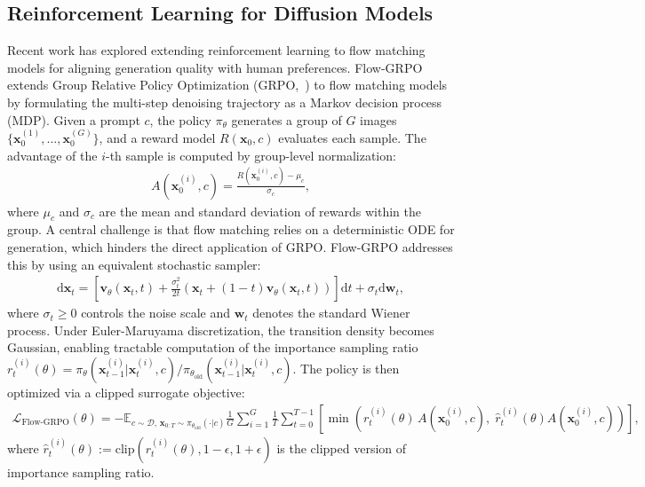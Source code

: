 \documentclass{llmxive}
\providecommand{\bm}[1]{\boldsymbol{#1}}
\providecommand{\mathbf}[1]{\bm{#1}}
\begin{document}
\subsection{Reinforcement Learning for Diffusion Models}
\label{sec:rl_background}

Recent work has explored extending reinforcement learning to flow matching models for aligning generation quality with human preferences. Flow-GRPO~\citep{liu2025flowgrpo} extends Group Relative Policy Optimization (GRPO,~\citealt{shao2024deepseekmath}) to flow matching models by formulating the multi-step denoising trajectory as a Markov decision process (MDP). Given a prompt $c$, the policy $\pi_\theta$ generates a group of $G$ images $\{\mathbf{x}_0^{(1)}, \ldots, \mathbf{x}_0^{(G)}\}$, and a reward model $R(\mathbf{x}_0, c)$ evaluates each sample. The advantage of the $i$-th sample is computed by group-level normalization:
\begin{align}
    A(\mathbf{x}_0^{(i)}, c) = \frac{R(\mathbf{x}_0^{(i)}, c) - \mu_c}{\sigma_c},
    \label{eq:rl_adv}
\end{align}
where $\mu_c$ and $\sigma_c$ are the mean and standard deviation of rewards within the group. A central challenge is that flow matching relies on a deterministic ODE for generation, which hinders the direct application of GRPO. Flow-GRPO addresses this by using an equivalent stochastic sampler:
\begin{align}
    \mathrm{d}\mathbf{x}_t = \left[\mathbf{v}_\theta(\mathbf{x}_t, t) + \frac{\sigma_t^2}{2t}\left(\mathbf{x}_t + (1-t)\mathbf{v}_\theta(\mathbf{x}_t, t)\right)\right]\mathrm{d}t + \sigma_t \mathrm{d}\mathbf{w}_t,
    \label{eq:flow_sde}
\end{align}
where $\sigma_t\geq0$ controls the noise scale and $\mathbf{w}_t$ denotes the standard Wiener process. Under Euler-Maruyama discretization, the transition density becomes Gaussian, enabling tractable computation of the importance sampling ratio $r_t^{(i)}(\theta) = \pi_\theta(\mathbf{x}_{t-1}^{(i)} | \mathbf{x}_t^{(i)}, c) / \pi_{\theta_\text{old}}(\mathbf{x}_{t-1}^{(i)} | \mathbf{x}_t^{(i)}, c)$.
The policy is then optimized via a clipped surrogate objective:
\begin{align}
    \mathcal{L}_{\text{Flow-GRPO}}(\theta) = -\mathbb{E}_{c\sim\mathcal{D},\,\mathbf{x}_{0:T} \sim \pi_{\theta_{\text{old}}}(\cdot | c)}\frac{1}{G} \sum_{i=1}^{G} \frac{1}{T} \sum_{t=0}^{T-1} \left[\min\!\left(r_t^{(i)}(\theta)\,A(\mathbf{x}_0^{(i)}, c) ,\; \hat{r}_t^{(i)}(\theta)A(\mathbf{x}_0^{(i)}, c) \right) \right],
    \label{eq:flow_grpo_obj}
\end{align}
where $\hat{r}_t^{(i)}(\theta):=\text{clip}\!\left(r_t^{(i)}(\theta), 1{-}\epsilon, 1{+}\epsilon\right)$ is the clipped version of importance sampling ratio. 
\end{document}
